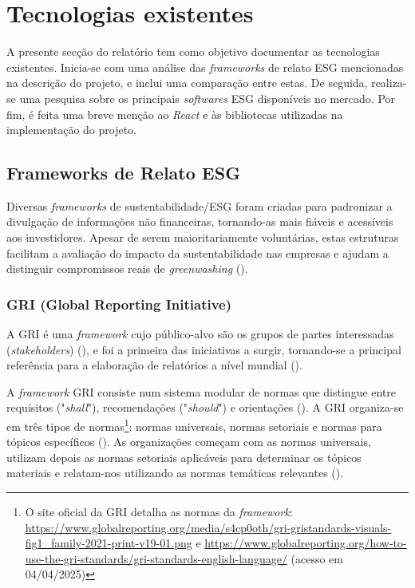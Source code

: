 
\section{Tecnologias existentes} 
\label{sec:TechExist}

A presente secção do relatório tem como objetivo documentar as tecnologias existentes. Inicia-se com uma análise das \textit{frameworks} de relato ESG mencionadas na descrição do projeto, e inclui uma comparação entre estas. De seguida, realiza-se uma pesquisa sobre os principais \textit{softwares} ESG disponíveis no mercado. Por fim, é feita uma breve menção ao \textit{React} e às bibliotecas utilizadas na implementação do projeto.

\subsection{Frameworks de Relato ESG}
\label{subsec: FRESG}

Diversas \textit{frameworks} de sustentabilidade/ESG foram criadas para padronizar a divulgação de informações não financeiras, tornando-as mais fiáveis e acessíveis aos investidores. Apesar de serem maioritariamente voluntárias, estas estruturas facilitam a avaliação do impacto da sustentabilidade nas empresas e ajudam a distinguir compromissos reais de \textit{greenwashing} (\cite{Cruz2023}).

\subsubsection{GRI (Global Reporting Initiative)}
\label{subsubsec: GRI}

A \gls{GRI} é uma \textit{framework} cujo público-alvo são os grupos de partes interessadas (\textit{stakeholders}) (\cite{GRISASB2021}), e foi a primeira das iniciativas a surgir, tornando-se a principal referência para a elaboração de relatórios a nível mundial (\cite{Luque-Vlchez2023}).

A \textit{framework} GRI consiste num sistema modular de normas que distingue entre requisitos ("\textit{shall}"), recomendações ("\textit{should}") e orientações (\cite{Adams2022}). A \gls{GRI} organiza-se em três tipos de normas\footnote{O site oficial da \gls{GRI} detalha as normas da \textit{framework}: \url{https://www.globalreporting.org/media/s4cp0oth/gri-gristandards-visuals-fig1_family-2021-print-v19-01.png} e \url{https://www.globalreporting.org/how-to-use-the-gri-standards/gri-standards-english-language/} (acesso em 04/04/2025)}: normas universais, normas setoriais e normas para tópicos específicos (\cite{GRI2025}). As organizações começam com as normas universais, utilizam depois as normas setoriais aplicáveis para determinar os tópicos materiais e relatam-nos utilizando as normas temáticas relevantes (\cite{GRISector2025}).

